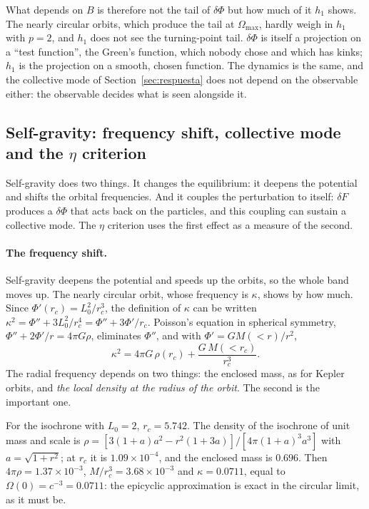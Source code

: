 \documentclass[11pt,a4paper]{article}
\begin{document}
What depends on $B$ is therefore not the tail of $\delta\Phi$ but how much of it $h_1$ shows.
The nearly circular orbits, which produce the tail at $\Omega_{\max}$, hardly weigh in $h_1$
with $p=2$, and $h_1$ does not see the turning-point tail. $\delta\Phi$ is itself a projection
on a ``test function'', the Green's function, which nobody chose and which has kinks;
$h_1$ is the projection on a smooth, chosen function. The dynamics is the same, and the
collective mode of Section~\ref{sec:respuesta} does not depend on the observable either:
the observable decides what is seen alongside it.

\subsection{Self-gravity: frequency shift, collective mode and the \texorpdfstring{$\eta$}{eta} criterion}
\label{sec:autogravedad}

Self-gravity does two things. It changes the equilibrium: it deepens the potential and
shifts the orbital frequencies. And it couples the perturbation to itself: $\delta F$
produces a $\delta\Phi$ that acts back on the particles, and this coupling can sustain a
collective mode. The $\eta$ criterion uses the first effect as a measure of the second.

\paragraph{The frequency shift.}
\label{sec:corrimiento}
Self-gravity deepens the potential and speeds up the orbits, so the whole band moves up.
The nearly circular orbit, whose frequency is $\kappa$, shows by how much. Since
$\Phi'(r_c)=L_0^2/r_c^3$, the definition of $\kappa$ can be written
$\kappa^2=\Phi''+3L_0^2/r_c^4=\Phi''+3\Phi'/r_c$. Poisson's equation in spherical symmetry,
$\Phi''+2\Phi'/r=4\pi G\rho$, eliminates $\Phi''$, and with $\Phi'=GM(<r)/r^2$,
\[
  \kappa^2 = 4\pi G\,\rho(r_c) + \frac{G\,M(<r_c)}{r_c^3} .
\]
The radial frequency depends on two things: the enclosed mass, as for Kepler orbits,
and \emph{the local density at the radius of the orbit}. The second is the important one.

For the isochrone with $L_0=2$, $r_c=5.742$. The density of the isochrone of unit mass and
scale is $\rho = [3(1+a)a^2 - r^2(1+3a)]/[4\pi(1+a)^3a^3]$ with $a=\sqrt{1+r^2}$; at $r_c$ it is
$1.09\times10^{-4}$, and the enclosed mass is $0.696$. Then $4\pi\rho = 1.37\times10^{-3}$,
$M/r_c^3 = 3.68\times10^{-3}$ and $\kappa = 0.0711$, equal to $\Omega(0) = c^{-3} = 0.0711$: the
epicyclic approximation is exact in the circular limit, as it must be.
\end{document}
